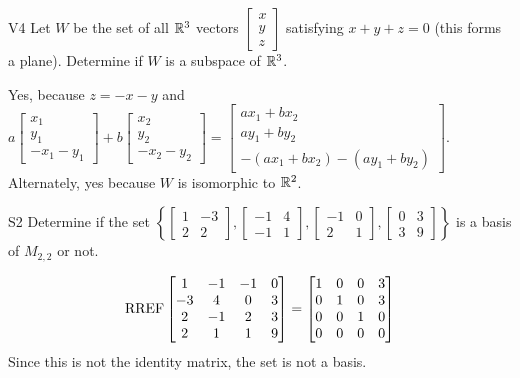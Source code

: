\documentclass{sbgLAquiz}
\begin{document}
\begin{extract}\newpage\end{extract}
\begin{problem}{V4} Let \(W\) be the set of all \(\mathbb{R}^3\) vectors
\(\begin{bmatrix} x \\ y \\ z \end{bmatrix}\) satisfying \(x+y+z=0\) (this forms a plane).
Determine if \(W\) is a subspace of \(\mathbb{R}^3\).
\end{problem}
\begin{solution}
Yes, because \(z=-x-y\) and
\(
  a\begin{bmatrix} x_1 \\ y_1 \\ -x_1-y_1 \end{bmatrix}+
  b\begin{bmatrix} x_2 \\ y_2 \\ -x_2-y_2 \end{bmatrix}=
  \begin{bmatrix}
    ax_1+bx_2 \\
    ay_1+by_2 \\
    -(ax_1+bx_2)-(ay_1+by_2)
  \end{bmatrix}
\).
Alternately, yes because \(W\) is isomorphic to \(\mathbb{R}^2\).
\end{solution}


\begin{problem}{S2}
Determine if the set $\left\{ 
\begin{bmatrix} 1 & -3 \\ 2 & 2 \end{bmatrix}, 
\begin{bmatrix} -1 & 4 \\ -1 & 1 \end{bmatrix}, 
\begin{bmatrix} -1 & 0 \\ 2 & 1 \end{bmatrix}, 
\begin{bmatrix} 0 & 3 \\ 3 & 9 \end{bmatrix} 
\right\}$ is a basis of $M_{2,2}$ or not.
\end{problem}

\begin{solution}
$$\operatorname{RREF} \begin{bmatrix} 1 & -1 & -1 & 0 \\ -3 & 4 & 0 & 3 \\ 2 & -1 & 2 & 3 \\ 2 & 1 & 1 & 9 \end{bmatrix}=\begin{bmatrix} 1 &0 & 0 & 3 \\ 0 & 1 & 0 & 3 \\ 0 & 0 & 1 & 0 \\ 0 & 0 & 0 & 0 \end{bmatrix}$$
Since this is not the identity matrix, the set is not a basis.
\end{solution}
\end{document}
